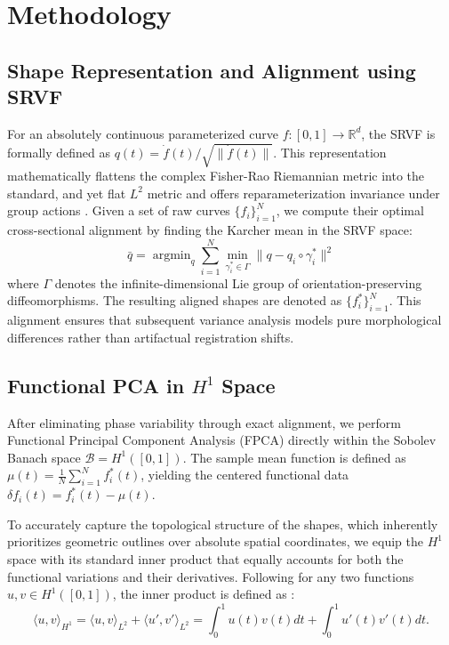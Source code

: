 \documentclass[twoside]{article}
\DeclareMathOperator*{\argmin}{argmin}
\begin{document}
\section{Methodology}
\label{sec:methodology}

\subsection{Shape Representation and Alignment using SRVF}
For an absolutely continuous parameterized curve $f: [0,1] \to \mathbb{R}^d$, the SRVF is formally defined as $q(t) = \dot{f}(t) / \sqrt{\|\dot{f}(t)\|}$. This representation mathematically flattens the complex Fisher-Rao Riemannian metric into the standard, and yet flat $L^2$ metric and offers reparameterization invariance under group actions \citep{srivastava2011shape}. Given a set of raw curves $\{f_i\}_{i=1}^N$, we compute their optimal cross-sectional alignment by finding the Karcher mean in the SRVF space:
$$ \bar{q} = \argmin_{q} \sum_{i=1}^N \min_{\gamma^{*}_i \in \Gamma} \|q - q_i \circ \gamma^{*}_i\|^2 $$
where $\Gamma$ denotes the infinite-dimensional Lie group of orientation-preserving diffeomorphisms. The resulting aligned shapes are denoted as $\{f_i^*\}_{i=1}^N$. This alignment ensures that subsequent variance analysis models pure morphological differences rather than artifactual registration shifts.

\subsection{Functional PCA in $H^1$ Space}
After eliminating phase variability through exact alignment, we perform Functional Principal Component Analysis (FPCA) directly within the Sobolev Banach space $\mathcal{B} = H^1([0,1])$. The sample mean function is defined as $\mu(t) = \frac{1}{N} \sum_{i=1}^N f_i^*(t)$, yielding the centered functional data $\delta f_i(t) = f_i^*(t) - \mu(t)$. 

To accurately capture the topological structure of the shapes, which inherently prioritizes geometric outlines over absolute spatial coordinates, we equip the $H^1$ space with its standard inner product that equally accounts for both the functional variations and their derivatives. Following \cite{brezis2011functional} for any two functions $u, v \in H^1([0,1])$, the inner product is defined as :
\begin{equation*}
\label{eq:h1_inner_product}
\langle u, v \rangle_{H^1} = \langle u, v \rangle_{L^2} + \langle u', v' \rangle_{L^2} = \int_{0}^{1} u(t)v(t) dt 
+ \int_{0}^{1} u'(t)v'(t) dt.
\end{equation*}
\end{document}
